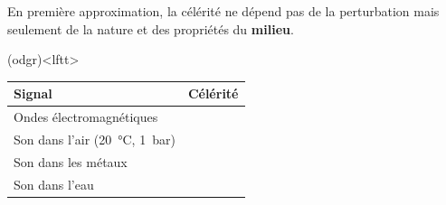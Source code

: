 \documentclass[../../main/main.tex]{subfiles}
\begin{document}
En première approximation, la célérité ne dépend pas de la perturbation mais
seulement de la nature et des propriétés du \textbf{milieu}.
\begin{tcb*}(odgr)<lftt>{}
	\begin{center}
		\label{tab:ctoknow}
		\begin{tabularx}{.6\linewidth}{lY}
			\toprule
			Signal                   & Célérité
			\\\midrule
			Ondes électromagnétiques & 
			\\
			Son dans l'air (\SI{20}{\degreeCelsius},
			\SI{1}{bar})             & 
			\\
			Son dans les métaux      & 
			\\
			Son dans l'eau           & 
			\\\bottomrule
		\end{tabularx}
	\end{center}
\end{tcb*}
\end{document}
